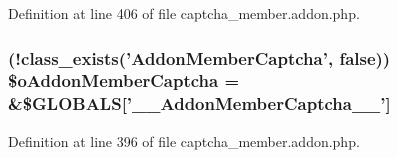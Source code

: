 Definition at line 406 of file captcha\-\_\-member.\-addon.\-php.

\hypertarget{captcha__member_8addon_8php_a31cda8178bc3156a0f1ea23c851844dd}{
\subsubsection[{\$o\-Addon\-Member\-Captcha}]{ (!class\-\_\-exists('Addon\-Member\-Captcha', false)) \$o\-Addon\-Member\-Captcha = \&\$G\-L\-O\-B\-A\-L\-S\mbox{[}'\-\_\-\-\_\-\-Addon\-Member\-Captcha\-\_\-\-\_\-'\mbox{]}}}\label{captcha__member_8addon_8php_a31cda8178bc3156a0f1ea23c851844dd}


Definition at line 396 of file captcha\-\_\-member.\-addon.\-php.

